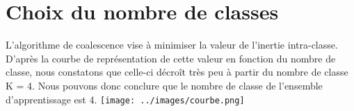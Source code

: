 \documentclass[a4paper,11pt]{article}
\begin{document}
\section{Choix du nombre de classes}
	L'algorithme de coalescence vise à minimiser la valeur de l'inertie intra-classe. 
D'après la courbe de représentation de cette valeur en fonction du nombre de classe, nous constatons que celle-ci décroît très peu à partir du nombre de classe K = 4. Nous pouvons donc conclure que le nombre de classe de l'ensemble d’apprentissage est 4. 
	\texttt{[image: ../images/courbe.png]}
\end{document}
